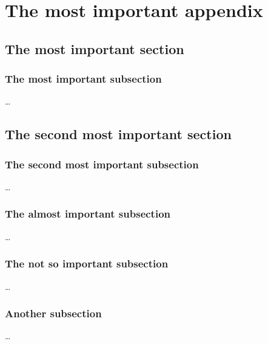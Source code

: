 \documentclass[debug]{phd}
\begin{document}
	\chapter{The most important appendix}
		\section{The most important section}
			\subsection{The most important subsection}
				\dots
		\section{The second most important section}
				
			\subsection{The second most important subsection}
				\ldots
			\subsection{The almost important subsection}
				\ldots
			\subsection{The not so important subsection}
				\ldots
			\subsection{Another subsection}
				\ldots

\end{document}
